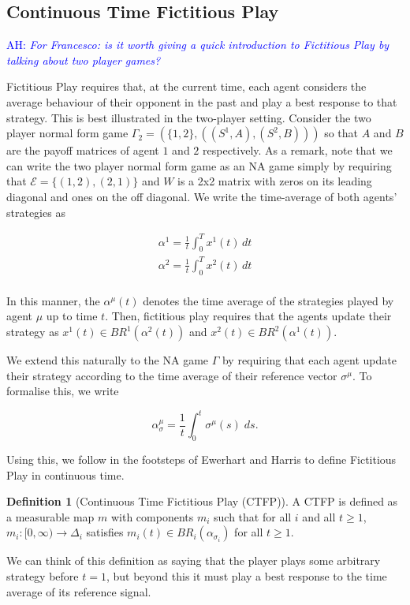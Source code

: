 \documentclass{article}
\theoremstyle{definition}
\newtheorem*{definition}{Definition}
\newcommand{\ah}[1]{\textcolor{blue}{AH: \textit{#1}}}
\newcommand{\edgeset}{\mathcal{E}}
\newcommand{\weightset}{W}
\newcommand{\refmu}{\sigma^{\mu}}
\newcommand{\avgref}[1]{\alpha_\sigma^{#1}}
\begin{document}
	\subsection{Continuous Time Fictitious Play}
	\label{sec::CTFP}

	\ah{For Francesco: is it worth giving a quick introduction to Fictitious Play by talking about two player games?}

	Fictitious Play requires that, at the current time, each agent considers the average behaviour
	of their opponent in the past and play a best response to that strategy. This is best
	illustrated in the two-player setting. Consider the two player normal form game $\Gamma_2 = (\{
	1, 2\}, ((S^1, A), (S^2, B)))$ so that $A$ and $B$ are the payoff matrices of agent $1$ and $2$
	respectively. As a remark, note that we can write the two player normal form game as an NA game
	simply by requiring that $\edgeset = \{(1, 2), (2, 1)\}$ and $\weightset$ is a 2x2 matrix with
	zeros on its leading diagonal and ones on the off diagonal. We write the time-average of both
	agents' strategies as 

	\begin{align}
		\alpha^1 = \frac{1}{t} \int_0^T x^1(t) \, dt \\
		\alpha^2 = \frac{1}{t} \int_0^T x^2(t) \, dt \\
	\end{align}

	In this manner, the $\alpha^\mu(t)$ denotes the time average of the strategies played by agent
	$\mu$ up to time $t$. Then, fictitious play requires that the agents update their strategy as
	$x^1(t) \in BR^1(\alpha^2(t))$ and $x^2(t) \in
	BR^2(\alpha^1(t))$. 

	We extend this naturally to the NA game $\Gamma$ by requiring that each agent update their
	strategy according to the time average of their reference vector $\refmu$. To formalise this, we
	write

	\begin{equation}
		\avgref{\mu} = \frac{1}{t} \int_0^t \refmu(s) \; ds.
	\end{equation}

	Using this, we follow in the footsteps of Ewerhart \cite{} and Harris \cite{} to define
	Fictitious Play in continuous time.

	\begin{definition}[Continuous Time Fictitious Play (CTFP)]
		A CTFP is defined as a measurable map $m$ with components $m_i$ such that for all $i$ and all $t \geq 1$, $m_i: [0, \infty) \rightarrow \Delta_i$ satisfies $m_i(t) \in BR_i(\alpha_{\sigma_i})$ for all $t \geq 1$.

		We can think of this definition as saying that the player plays some arbitrary strategy before $t = 1$, but beyond this it must play a best response to the time average of its reference signal.
	\end{definition}
\end{document}
